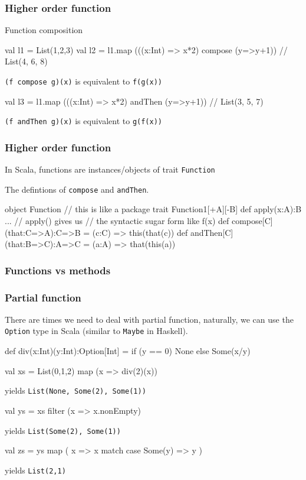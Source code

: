 \documentclass{beamer}
\newcommand{\beb}{\begin{exampleblock}}
\newcommand{\eeb}{\end{exampleblock}}
\begin{document}
\begin{frame}[fragile]
\frametitle{Higher order function}
Function composition
\beb{}
\begin{code}
val l1 = List(1,2,3)
val l2 = l1.map (((x:Int) => x*2) compose (y=>y+1)) 
//  List(4, 6, 8)
\end{code}
\eeb
{\tt (f compose g)(x)} is equivalent to  {\tt f(g(x))}
\beb{}
\begin{code}
val l3 = l1.map (((x:Int) => x*2) andThen (y=>y+1))  
// List(3, 5, 7)
\end{code}
\eeb
{\tt (f andThen g)(x)} is equivalent to  {\tt g(f(x))}

\end{frame}


\begin{frame}[fragile]
\frametitle{Higher order function}
In Scala, functions are instances/objects of trait {\tt Function}
\beb{The defintions of {\tt compose} and {\tt andThen}.}
\begin{code}
object Function { // this is like a package
    trait Function1[+A][-B] {
       def apply(x:A):B {...} 
       // apply() gives us
       // the syntactic sugar form like f(x)
       def compose[C](that:C=>A):C=>B = 
         (c:C) => this(that(c))
       def andThen[C](that:B=>C):A=>C = 
         (a:A) => that(this(a))
    }
}
\end{code}
\eeb

\end{frame}


\begin{frame}[fragile]
\frametitle{Functions vs methods}

\end{frame}


\begin{frame}[fragile]
\frametitle{Partial function}
There are times we need to deal with partial function, naturally, we
can use the {\tt Option} type in Scala (similar to {\tt Maybe} in
Haskell).
\beb{}
\begin{code}
def div(x:Int)(y:Int):Option[Int] =  {
    if (y == 0) None else Some(x/y)
}

val xs = List(0,1,2) map (x => div(2)(x))
\end{code}
\eeb
yields {\tt  List(None, Some(2), Some(1))}
\beb{}
\begin{code}
val ys = xs filter (x => x.nonEmpty) 
\end{code}
\eeb
yields {\tt List(Some(2), Some(1))}
\beb{}
\begin{code}
val zs = ys map ( x => x match { case Some(y) => y } ) 
\end{code}
\eeb
yields {\tt List(2,1)}
\end{frame}
\end{document}
